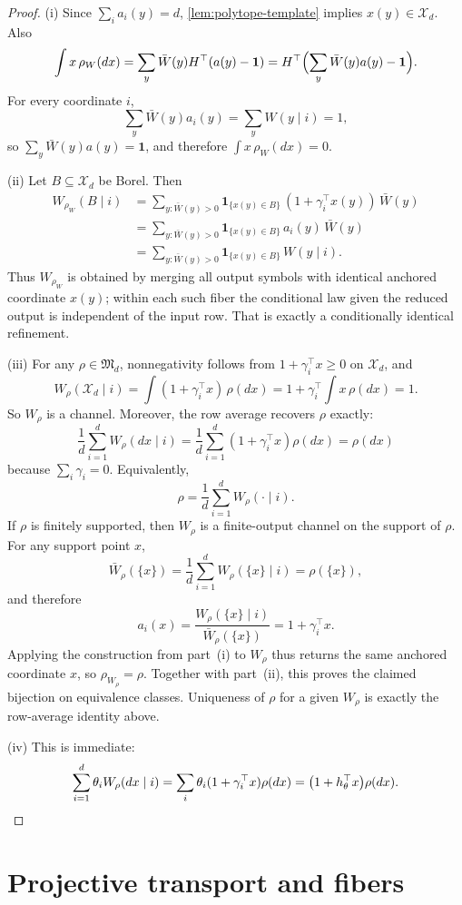 \documentclass[11pt]{amsart}
\theoremstyle{definition}
\newcommand{\one}{\mathbf 1}
\newcommand{\cX}{\mathcal X}
\newcommand{\fM}{\mathfrak M}
\begin{document}
\begin{proof}
(i) Since $\sum_i a_i(y)=d$, \cref{lem:polytope-template} implies $x(y)\in\cX_d$. Also
\[
\int x\,\rho_W(dx)=\sum_y \bar W(y) H^\top(a(y)-\one)
=H^\top\Bigl(\sum_y \bar W(y)a(y)-\one\Bigr).
\]
For every coordinate $i$,
\[
\sum_y \bar W(y) a_i(y)=\sum_y W(y\mid i)=1,
\]
so $\sum_y \bar W(y)a(y)=\one$, and therefore $\int x\,\rho_W(dx)=0$.

(ii) Let $B\subseteq\cX_d$ be Borel. Then
\[
\begin{aligned}
W_{\rho_W}(B\mid i)
&=\sum_{y:\bar W(y)>0}\mathbf 1_{\{x(y)\in B\}}\,(1+\gamma_i^\top x(y))\,\bar W(y)\\
&=\sum_{y:\bar W(y)>0}\mathbf 1_{\{x(y)\in B\}}\,a_i(y)\,\bar W(y)\\
&=\sum_{y:\bar W(y)>0}\mathbf 1_{\{x(y)\in B\}}\,W(y\mid i).
\end{aligned}
\]
Thus $W_{\rho_W}$ is obtained by merging all output symbols with identical anchored coordinate $x(y)$; within each such fiber the conditional law given the reduced output is independent of the input row. That is exactly a conditionally identical refinement.

(iii) For any $\rho\in\fM_d$, nonnegativity follows from $1+\gamma_i^\top x\ge 0$ on $\cX_d$, and
\[
W_\rho(\cX_d\mid i)=\int (1+\gamma_i^\top x)\,\rho(dx)=1+\gamma_i^\top\int x\,\rho(dx)=1.
\]
So $W_\rho$ is a channel. Moreover, the row average recovers $\rho$ exactly:
\[
\frac1d\sum_{i=1}^d W_\rho(dx\mid i)=\frac1d\sum_{i=1}^d (1+\gamma_i^\top x)\rho(dx)=\rho(dx)
\]
because $\sum_i \gamma_i=0$. Equivalently,
\[
\rho=\frac1d\sum_{i=1}^d W_\rho(\cdot\mid i).
\]
If $\rho$ is finitely supported, then $W_\rho$ is a finite-output channel on the support of $\rho$. For any support point $x$,
\[
\bar W_\rho(\{x\})=\frac1d\sum_{i=1}^d W_\rho(\{x\}\mid i)=\rho(\{x\}),
\]
and therefore
\[
a_i(x)=\frac{W_\rho(\{x\}\mid i)}{\bar W_\rho(\{x\})}=1+\gamma_i^\top x.
\]
Applying the construction from part~(i) to $W_\rho$ thus returns the same anchored coordinate $x$, so $\rho_{W_\rho}=\rho$. Together with part~(ii), this proves the claimed bijection on equivalence classes. Uniqueness of $\rho$ for a given $W_\rho$ is exactly the row-average identity above.

(iv) This is immediate:
\[
\sum_{i=1}^d \theta_i W_\rho(dx\mid i)
=\sum_i \theta_i(1+\gamma_i^\top x)\rho(dx)
=\bigl(1+h_\theta^\top x\bigr)\rho(dx).
\qedhere
\]
\end{proof}


\section{Projective transport and fibers}\label{sec:projective}
\end{document}
